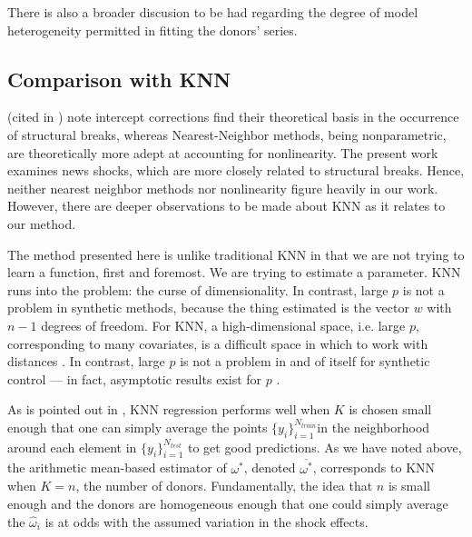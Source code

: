 \documentclass[11pt,3p,review,authoryear]{elsarticle}
\theoremstyle{definition}
\begin{document}
There is also a broader discusion to be had regarding the degree of model heterogeneity permitted in fitting the donors' series.  

\subsection{Comparison with KNN}

\cite{clements1996intercept} (cited in \cite{guerron2017macroeconomic})  note intercept corrections find their theoretical basis in the occurrence of structural breaks, whereas Nearest-Neighbor methods, being nonparametric, are theoretically more adept at accounting for nonlinearity.  The present work examines news shocks, which are more closely related to structural breaks.  Hence, neither nearest neighbor methods nor nonlinearity figure heavily in our work.  However, there are deeper observations to be made about KNN as it relates to our method.

The method presented here is unlike traditional KNN in that we are not trying to learn a function, first and foremost.  We are trying to estimate a parameter.  KNN runs into the problem: the curse of dimensionality.  In contrast, large $p$ is not a problem in synthetic methods, because the thing estimated is the vector $w$ with $n-1$ degrees of freedom.  For KNN, a high-dimensional space, i.e. large $p$, corresponding to many covariates, is a difficult space in which to work with distances \citep{hastie2009elements}.  In contrast, large $p$ is not a problem in and of itself for synthetic control --- in fact, asymptotic results exist for $p$ \citep{abadie2010synthetic}.  

As is pointed out in \citet{hastie2009elements}, KNN regression performs well when $K$ is chosen small enough that one can simply average the points $\{y_{i}\}_{i=1}^{N_{train}}$in the neighborhood around each element in $\{y_{i}\}_{i=1}^{N_{test}}$ to get good predictions.  As we have noted above, the arithmetic mean-based estimator of $\omega^{*}$, denoted $\overline{\omega^{*}}$, corresponds to KNN when $K = n$, the number of donors.  Fundamentally, the idea that $n$ is small enough and the donors are homogeneous enough that one could simply average the $\hat\omega_{i}$ is at odds with the assumed variation in the shock effects.
\end{document}
